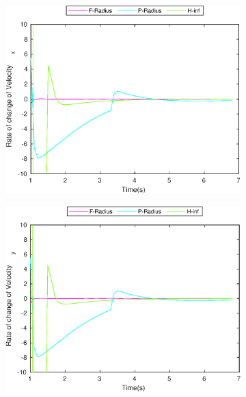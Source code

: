 \begin{figure}[!h]
\begin{subfigure}{.5\linewidth}
\end{subfigure}
\begin{subfigure}{.5\linewidth}
\centering
\includegraphics[width=.9\linewidth]{figures/BoundChange/CA/ca_bound_changeVelocity_x}
\end{subfigure}
\begin{subfigure}{.5\linewidth}
\centering
\includegraphics[width=.9\linewidth]{figures/BoundChange/CA/ca_bound_changeVelocity_y}
\end{subfigure}
\begin{subfigure}{.5\linewidth}
\centering

\end{subfigure}
\end{figure}
